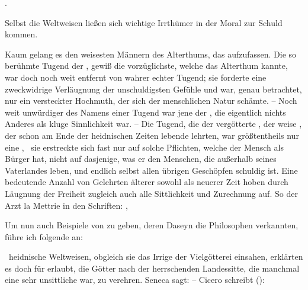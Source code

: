 \begin{aufza}
\item {}.\par
Selbst die Weltweisen ließen sich wichtige Irrthümer in der Moral zur Schuld kommen.
\begin{aufzb}
\item Kaum gelang es den weisesten Männern des Alterthums, das  aufzufassen. Die so berühmte Tugend der , gewiß die vorzüglichste, welche das Alterthum kannte, war doch noch weit entfernt von wahrer echter Tugend; sie forderte eine zweckwidrige Verläugnung der unschuldigsten Gefühle und war, genau betrachtet, nur ein versteckter Hochmuth, der sich der menschlichen Natur schämte. -- Noch weit unwürdiger des Namens einer Tugend war jene der , die eigentlich nichts Anderes als kluge Sinnlichkeit war. -- Die Tugend, die der vergötterte , der weise , der schon am Ende der heidnischen Zeiten lebende  lehrten, war größtentheils nur eine , \dh\ sie erstreckte sich fast nur auf solche Pflichten, welche der Mensch als Bürger hat, nicht auf dasjenige, was er den Menschen, die außerhalb seines Vaterlandes leben, und endlich selbst allen übrigen Geschöpfen schuldig ist. Eine bedeutende Anzahl von Gelehrten älterer sowohl als neuerer Zeit hoben durch Läugnung der Freiheit zugleich auch alle Sittlichkeit und Zurechnung auf. So der Arzt la Mettrie in den Schriften: , \umA
\item Um nun auch Beispiele von  zu geben, deren Daseyn die Philosophen verkannten, führe ich folgende an:
\begin{aufzc}
\item {} \uma\ heidnische Weltweisen, obgleich sie das Irrige der Vielgötterei einsahen, erklärten es doch für erlaubt, die Götter nach der herrschenden Landessitte, die manchmal eine sehr unsittliche war, zu verehren. Seneca sagt:  -- Cicero schreibt (): 

\end{aufzc}
\end{aufzb}
\end{aufza}
